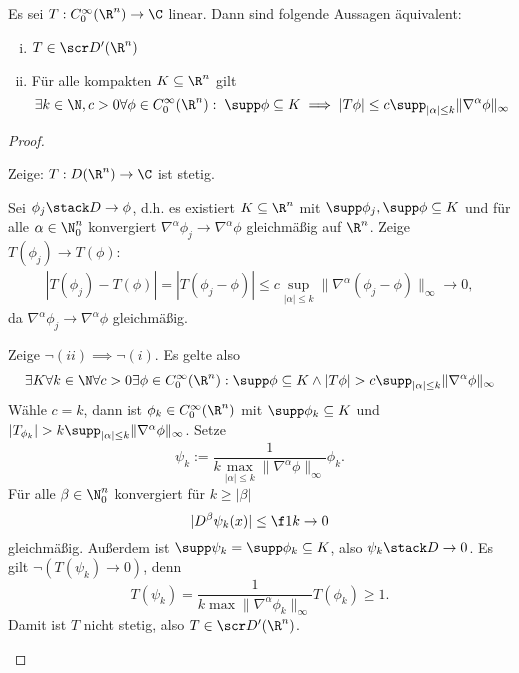 \begin{st} \label{5.25}
	Es sei $T : C_0^\infty (\R^n) \to \C$ linear.
	Dann sind folgende Aussagen äquivalent:
	\begin{enumerate}[(i)]
		\item
			$T \in \scr D'(\R^n)$
		\item
			Für alle kompakten $K \subset \R^n$ gilt
			\[
				\exists k \in \N, c > 0 \forall \phi \in C_0^\infty(\R^n) : \;
				\supp \phi \subset K \implies |T\phi| \le c \supp_{|\alpha| \le k} \|\nabla^\alpha \phi\|_\infty
			\]
	\end{enumerate}
	\begin{proof}
		\begin{seg}[(ii)$\implies$(i)]
			Zeige: $T : D(\R^n) \to \C$ ist stetig.

			Sei $\phi_j \stack D\to \phi$, d.h. es existiert $K \subset \R^n$ mit $\supp \phi_j, \supp \phi \subset K$ und für alle $\alpha \in \N_0^n$ konvergiert $\nabla^\alpha \phi_j \to \nabla^\alpha \phi$ gleichmäßig auf $\R^n$.
			Zeige $T(\phi_j) \to T(\phi)$:
			\begin{align*}
				|T(\phi_j) - T(\phi)|
				= | T(\phi_j-\phi)|
				\le c \sup_{|\alpha| \le k} \| \nabla^\alpha (\phi_j - \phi) \|_\infty
				\to 0,
			\end{align*}
			da $\nabla^\alpha \phi_j \to \nabla^\alpha \phi$ gleichmäßig.
		\end{seg}
		\begin{seg}[(i)$\implies$ (ii)]			
			Zeige $\lnot (ii) \implies \lnot (i)$.
			Es gelte also
			\begin{align*}
				\exists K \forall k \in \N \forall c > 0 \exists \phi \in C_0^\infty(\R^n)
				: \supp \phi \subset K \land |T\phi| > c \supp_{|\alpha|\le k} \|\nabla^\alpha \phi \|_\infty
			\end{align*}
			Wähle $c = k$, dann ist $\phi_k \in C_0^\infty (\R^n)$ mit $\supp \phi_k \subset K$ und $|T_{\phi_k}| > k \supp_{|\alpha| \le k} \|\nabla^\alpha \phi\|_\infty$.
			Setze
			\[
				\psi_k := \dfrac 1{k \max_{|\alpha| \le k}\| \nabla^\alpha \phi\|_\infty} \phi_k.
			\]
			Für alle $\beta \in \N_0^n$ konvergiert für $k \ge |\beta|$
			\[
				|D^\beta \psi_k(x)| \le \f 1k \to 0
			\]
			gleichmäßig.
			Außerdem ist $\supp \psi_k = \supp \phi_k \subset K$, also $\psi_k \stack D\to 0$.
			Es gilt $\lnot (T(\psi_k) \to 0)$, denn
			\[
				T(\psi_k) = \dfrac 1{k \max\|\nabla^\alpha \phi_k\|_\infty} T(\phi_k) \ge 1.
			\]
			Damit ist $T$ nicht stetig, also $T \in \scr D'(\R^n)$.
		\end{seg}
	\end{proof}
\end{st}
